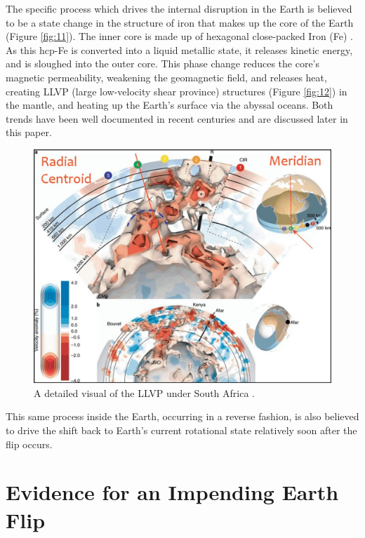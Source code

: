 \documentclass[10pt,twocolumn,letterpaper]{article}
\begin{document}
The specific process which drives the internal disruption in the Earth is believed to be a state change in the structure of iron that makes up the core of the Earth (Figure \ref{fig:11}). The inner core is made up of hexagonal close-packed Iron (Fe) \cite{141}. As this hcp-Fe is converted into a liquid metallic state, it releases kinetic energy, and is sloughed into the outer core. This phase change reduces the core's magnetic permeability, weakening the geomagnetic field, and releases heat, creating LLVP (large low-velocity shear province) structures (Figure \ref{fig:12}) \cite{38} in the mantle, and heating up the Earth's surface via the abyssal oceans. Both trends have been well documented in recent centuries and are discussed later in this paper.


\begin{figure}[t]
\begin{center}
   \includegraphics[width=1\linewidth]{llvp.jpg}
\end{center}
   \caption{A detailed visual of the LLVP under South Africa \cite{28}.}
\label{fig:12}
\label{fig:onecol}
\end{figure}


This same process inside the Earth, occurring in a reverse fashion, is also believed to drive the shift back to Earth's current rotational state relatively soon after the flip occurs.

\section{Evidence for an Impending Earth Flip}
\end{document}
